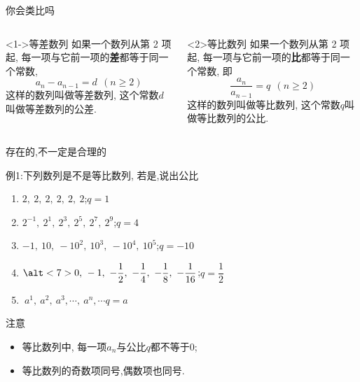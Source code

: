 \documentclass[mathserif,blue]{beamer}
\newcommand\colorwordsa[1]{\textcolor[rgb]{0,.63,.91}{\small\heiti#1}}%
\begin{document}
\begin{frame}{你会类比吗}
\kaishu
  \begin{columns}
  \begin{column}{0.5\textwidth}
    \begin{block}<1->{等差数列}
      如果一个数列\an 从第 2 项起, 每一项与它前一项的\textbf{差}都等于同一个常数, $$a_{n}-a_{n-1}=d~~(n\geqslant2)$$ 这样的数列叫做\colorwordsa{等差数列}, 这个常数$d$ 叫做等差数列的\colorwordsa{公差}.
    \end{block}
  \end{column}
  \begin{column}{0.5\textwidth}
    \begin{block}<2>{等比数列}
      如果一个数列\an 从第 2 项起, 每一项与它前一项的\textbf{比}都等于同一个常数, 即$$\frac{a_{n}}{a_{n-1}}=q~~(n\geqslant2)$$这样的数列叫做\colorwordsa{等比数列}, 这个常数$q$叫做等比数列的\colorwordsa{公比}.
    \end{block}
  \end{column}
  \end{columns}
\end{frame}


\begin{frame}{存在的,不一定是合理的}
  \begin{exampleblock}{例1:下列数列是不是等比数列, 若是,说出公比}
  \begin{enumerate}
    \item $2,~2,~2,~2,~2,~2$;\pause\hspace*{\fill}$q=1$\hspace*{.5in}\pause
    \item $2^{-1},~2^1,~2^3,~2^5,~2^7,~2^9$;\pause\hspace*{\fill}$q=4$\hspace*{.5in}\pause
    \item $-1,~10,~-10^2,~10^3,~-10^4,~10^5$;\vspace{1ex}\pause\hspace*{\fill}$q=-10$\hspace*{.5in}\pause
    \item $\alt<7>{0,~}{}-1,~-\dfrac12,~-\dfrac14,~-\dfrac18,~-\dfrac1{16}$;\vspace{1ex}\pause\pause\hspace*{\fill}$ q=\dfrac12$\hspace*{.5in}\pause
    \item $~a^1,~a^2,~a^3,\cdots,~a^n,\cdots$\pause\pause\hspace*{\fill}$q=a$\hspace*{.5in}\pause
  \end{enumerate}
  \end{exampleblock}
  \begin{alertblock}{注意}\pause
    \begin{itemize}[<+->]
       \item 等比数列\an 中, 每一项$a_n$与公比$q$都不等于\alert{$0$};
       \item 等比数列的奇数项同号,偶数项也同号.
     \end{itemize}
  \end{alertblock}
\end{frame}
\end{document}
